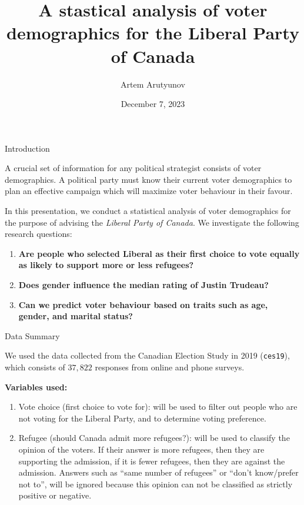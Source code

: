 \documentclass[
  ignorenonframetext,
]{beamer}
\title{A stastical analysis of voter demographics for the Liberal Party of
Canada}
\author{Artem Arutyunov}
\date{December 7, 2023}
\begin{document}
\frame{\titlepage}

\begin{frame}{Introduction}
\protect\hypertarget{introduction}{}

A crucial set of information for any political strategist consists of
voter demographics. A political party must know their current voter
demographics to plan an effective campaign which will maximize voter
behaviour in their favour.

In this presentation, we conduct a statistical analysis of voter
demographics for the purpose of advising the \emph{Liberal Party of
Canada}. We investigate the following research questions:

\begin{enumerate}
\item
  \textbf{Are people who selected Liberal as their first choice to vote
  equally as likely to support more or less refugees?}
\item
  \textbf{Does gender influence the median rating of Justin Trudeau?}
\item
  \textbf{Can we predict voter behaviour based on traits such as age,
  gender, and marital status?}
\end{enumerate}

\end{frame}

\begin{frame}[fragile]{Data Summary}
\protect\hypertarget{data-summary}{}

We used the data collected from the Canadian Election Study in 2019
(\texttt{ces19}), which consists of \(37,822\) responses from online and
phone surveys.

\textbf{Variables used:}

\begin{enumerate}
\item
  Vote choice (first choice to vote for): will be used to filter out
  people who are not voting for the Liberal Party, and to determine
  voting preference.
\item
  Refugee (should Canada admit more refugees?): will be used to classify
  the opinion of the voters. If their answer is more refugees, then they
  are supporting the admission, if it is fewer refugees, then they are
  against the admission. Answers such as ``same number of refugees'' or
  ``don't know/prefer not to'', will be ignored because this opinion can
  not be classified as strictly positive or negative.
\end{enumerate}

\end{frame}
\end{document}
